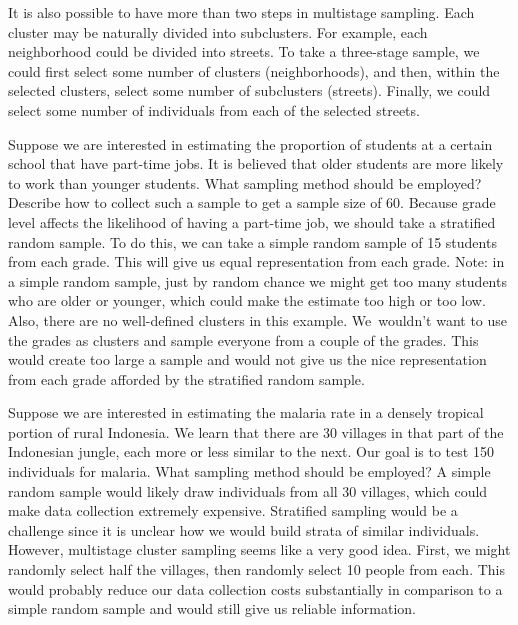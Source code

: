It is also possible to have more than two steps in multistage sampling. Each cluster may be naturally divided into subclusters. For example, each neighborhood could be divided into streets. To take a three-stage sample, we could first select some number of clusters (neighborhoods), and then, within the selected clusters, select some number of subclusters (streets). Finally, we could select some number of individuals from each of the selected streets.

\begin{examplewrap}
\begin{nexample}{Suppose we are interested in estimating the proportion of students at a certain school that have part-time jobs. It is believed that older students are more likely to work than younger students. What sampling method should be employed? Describe how to collect such a sample to get a sample size of 60.}
Because grade level affects the likelihood of having a part-time job, we should take a stratified random sample. To do this, we can take a simple random sample of 15 students from each grade. This will give us equal representation from each grade. Note: in a simple random sample, just by random chance we might get too many students who are older or younger, which could make the estimate too high or too low. Also, there are no well-defined clusters in this example. We~wouldn't want to use the grades as clusters and sample everyone from a couple of the grades. This would create too large a sample and would not give us the nice representation from each grade afforded by the stratified random sample.
\end{nexample}
\end{examplewrap}

\begin{examplewrap}
\begin{nexample}{Suppose we are interested in estimating the malaria rate in a densely tropical portion of rural Indonesia. We learn that there are 30 villages in that part of the Indonesian jungle, each more or less similar to the next. Our goal is to test 150 individuals for malaria. What sampling method should be employed?}
A simple random sample would likely draw individuals from all 30 villages, which could make data collection extremely expensive. Stratified sampling would be a challenge since it is unclear how we would build strata of similar individuals. However, multistage cluster sampling seems like a very good idea. First, we might randomly select half the villages, then randomly select 10 people from each. This would probably reduce our data collection costs substantially in comparison to a simple random sample and would still give us reliable information.
\end{nexample}
\end{examplewrap}

